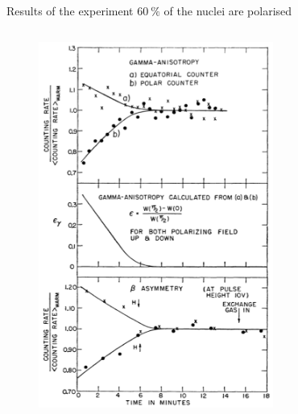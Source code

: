\documentclass[aspectratio=1610, 10pt]{beamer}
\begin{document}
\begin{frame}{Results of the experiment}
	\textrightarrow $\SI{60}{\percent}$ of the nuclei are polarised \nocite{PhysRev.105.1413}\nocite{WuExperiment}
	\begin{columns}
		\begin{figure}
			\includegraphics[width=0.9\textwidth]{images/Wu_result.png}
		\end{figure}
		\begin{figure}

\end{figure}
\end{columns}
\end{frame}
\end{document}
